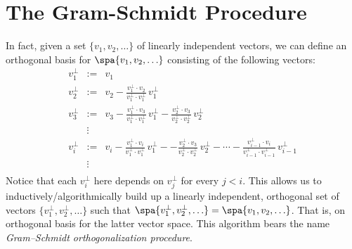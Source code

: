 \section{The Gram-Schmidt Procedure}
In fact, given a set $\{v_1, v_2, \ldots \}$ of linearly independent vectors, we can define an orthogonal basis for $\spa \{v_1,v_2, \ldots \}$ consisting of the following vectors:
\begin{eqnarray*}
v_1^\perp&:=&v_1 \\
v_2^\perp &:=& v_2 - \frac{v_1^\perp\cdot v_2}{v_1^\perp\cdot v_1^\perp}\,v_1^\perp \\
v_3^\perp &:=& v_3 - \frac{v_1^\perp\cdot v_3}{v_1^\perp\cdot v_1^\perp}\,v_1^\perp - \frac{v_2^\perp\cdot v_3}{v_2^\perp\cdot v_2^\perp}\,v_2^\perp\\
&\vdots& \\
v_i^\perp%
 &:=& v_i - \frac{v_1^\perp\cdot v_i}{v_1^\perp\cdot v_1^\perp}\,v_1^\perp -  
 - \frac{v_2^\perp\cdot v_3}{v_2^\perp\cdot v_2^\perp}\,v_2^\perp -\cdots
 - \frac{v_{i-1}^\perp\cdot v_i}{v_{i-1}^\perp\cdot v_{i-1}^\perp}\,v_{i-1}^\perp\\
&\vdots& \\
\end{eqnarray*}
Notice that each $v_i^\perp$ here depends on  $v_j^\perp$ for every $j<i$.  This allows us to inductively/algorithmically build up a linearly independent, orthogonal set of vectors 
$\{v_1^\perp,v_2^\perp, \ldots \}$ 
such that 
$\spa \{v_1^\perp,v_2^\perp, \ldots \}=\spa \{v_1, v_2, \ldots \}$. That is, on orthogonal basis for the latter vector space. This algorithm bears the name \emph{Gram--Schmidt orthogonalization procedure}\label{GramSchmidt}.

